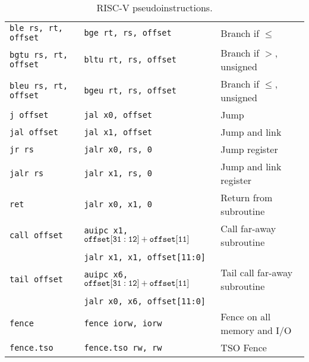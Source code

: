 \begin{table}[h]
\begin{small}
\begin{center}
\begin{tabular}{l l l}
{\tt ble rs, rt, offset} & {\tt bge rt, rs, offset} & Branch if $\leq$ \\
{\tt bgtu rs, rt, offset} & {\tt bltu rt, rs, offset} & Branch if $>$, unsigned \\
{\tt bleu rs, rt, offset} & {\tt bgeu rt, rs, offset} & Branch if $\leq$, unsigned \\
\hline
{\tt j offset} & {\tt jal x0, offset} & Jump \\
{\tt jal offset} & {\tt jal x1, offset} & Jump and link \\
{\tt jr rs} & {\tt jalr x0, rs, 0} & Jump register \\
{\tt jalr rs} & {\tt jalr x1, rs, 0} & Jump and link register \\
{\tt ret} & {\tt jalr x0, x1, 0} & Return from subroutine \\
\tt call offset & {\tt auipc x1, ${\tt offset[31:12]} + {\tt offset[11]}$} & Call far-away subroutine \\
                & {\tt jalr x1, x1, offset[11:0]}                          & \\
\tt tail offset & {\tt auipc x6, ${\tt offset[31:12]} + {\tt offset[11]}$} & Tail call far-away subroutine \\
                & {\tt jalr x0, x6, offset[11:0]}                          & \\
\hline
{\tt fence} & {\tt fence iorw, iorw} & Fence on all memory and I/O \\
{\tt fence.tso} & {\tt fence.tso rw, rw} & TSO Fence \\
\hline

\end{tabular}
\end{center}
\end{small}
\caption{RISC-V pseudoinstructions.}
\label{pseudos}
\end{table}

